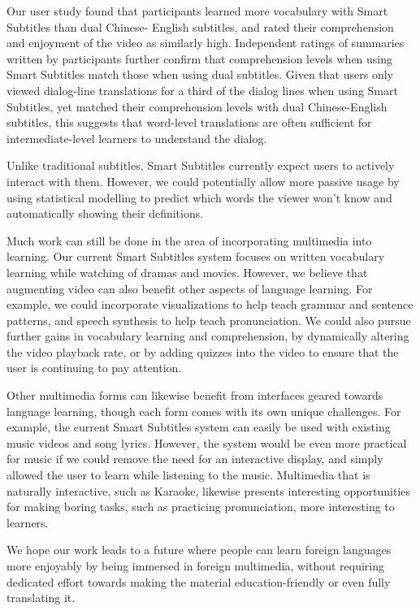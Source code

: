 \documentclass{sigchi}
\begin{document}
Our user study found that participants learned more
vocabulary with Smart Subtitles than dual Chinese-
English subtitles, and rated their comprehension and
enjoyment of the video as similarly high.
Independent ratings of summaries written by participants
further confirm that comprehension levels when using Smart Subtitles
match those when using dual subtitles.
Given that users only viewed dialog-line translations for a
third of the dialog lines when using Smart Subtitles,
yet matched their comprehension levels with dual Chinese-English subtitles,
this suggests that word-level translations are often sufficient for
intermediate-level learners to understand the dialog.

Unlike traditional subtitles, Smart Subtitles currently expect users to actively interact with them. However, we could potentially allow more
passive usage by using statistical modelling to predict which words the viewer
won’t know and automatically showing their definitions.

Much work can still be done in the area of incorporating multimedia into learning. Our current Smart Subtitles system focuses on written vocabulary learning while watching of dramas and movies.
However, we believe that augmenting video can also benefit other aspects of language learning. For example, we could
incorporate visualizations to help teach grammar and sentence patterns,
and speech synthesis to help teach pronunciation. We could also 
pursue further gains in vocabulary learning and comprehension,
by dynamically altering the video playback rate, or by adding
quizzes into the video to ensure that the user is continuing to pay attention.

Other multimedia forms can likewise benefit from interfaces geared
towards language learning, though each form comes with its own
unique challenges. For example, the current Smart Subtitles system can
easily be used with existing music videos and song lyrics.
However, the system would be even more practical for music if
we could remove the need for an interactive display, and simply
allowed the user to learn while listening to the music.
Multimedia that is naturally interactive, such as Karaoke,
likewise presents interesting opportunities for
making boring tasks, such as practicing pronunciation, more interesting
to learners.

We hope our work leads to a future where people can learn foreign languages more enjoyably by being immersed in foreign multimedia, without requiring dedicated effort towards making the material education-friendly or even fully translating it.

\balance





\end{document}
